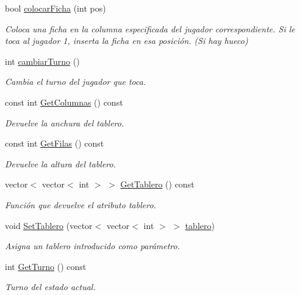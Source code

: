 \begin{DoxyCompactItemize}
bool \hyperlink{classTablero_a24bbcc0cf0a9e464f37a261cd9c6ff45}{colocar\+Ficha} (int pos)
\begin{DoxyCompactList}\small\item\em Coloca una ficha en la columna especificada del jugador correspondiente. Si le toca al jugador 1, inserta la ficha en esa posición. (Si hay hueco) \end{DoxyCompactList}\item 
int \hyperlink{classTablero_a6a07659599bca3442cce101d7bf42b9a}{cambiar\+Turno} ()
\begin{DoxyCompactList}\small\item\em Cambia el turno del jugador que toca. \end{DoxyCompactList}\item 
const int \hyperlink{classTablero_a509b0fc105dce485aefcdbd81dc452f5}{Get\+Columnas} () const
\begin{DoxyCompactList}\small\item\em Devuelve la anchura del tablero. \end{DoxyCompactList}\item 
const int \hyperlink{classTablero_a7d0c4ed88f099aaabad1362883b52ef1}{Get\+Filas} () const
\begin{DoxyCompactList}\small\item\em Devuelve la altura del tablero. \end{DoxyCompactList}\item 
vector$<$ vector$<$ int $>$ $>$ \hyperlink{classTablero_aa898aa59dd1d99df69b9f97ce51f33db}{Get\+Tablero} () const
\begin{DoxyCompactList}\small\item\em Función que devuelve el atributo tablero. \end{DoxyCompactList}\item 
void \hyperlink{classTablero_a811481680b64300b21fb4d1e9619e795}{Set\+Tablero} (vector$<$ vector$<$ int $>$ $>$ \hyperlink{classTablero_a5df607d108c0c0a14aa4f393b7f43030}{tablero})
\begin{DoxyCompactList}\small\item\em Asigna un tablero introducido como parámetro. \end{DoxyCompactList}\item 
int \hyperlink{classTablero_ac8467df724eeda4ad6b896de2abb1488}{Get\+Turno} () const
\begin{DoxyCompactList}\small\item\em Turno del estado actual. \end{DoxyCompactList}\item 

\end{DoxyCompactItemize}
